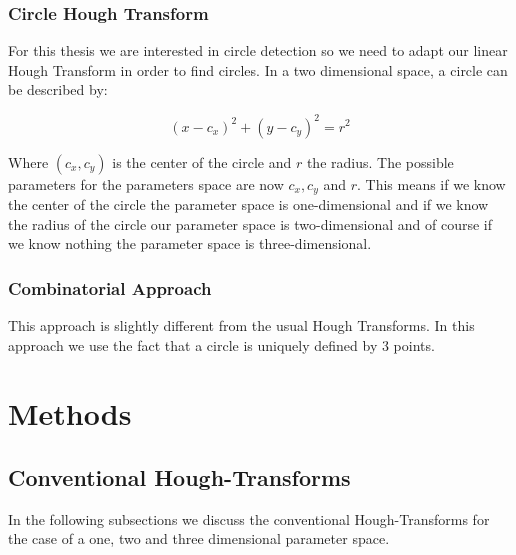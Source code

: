 \documentclass[10pt,twoside]{scrreprt}
\begin{document}


\subsection{Circle Hough Transform} %
\label{sub:circle_hough_transform}

For this thesis we are interested in circle detection so we need to adapt our linear Hough Transform in order to find circles. In a two dimensional space, a circle can be described by:

\begin{equation}
		(x-c_x)^2 + (y-c_y)^2 = r^2
\end{equation}

Where $(c_x,c_y)$ is the center of the circle and $r$ the radius. The possible parameters for the parameters space are now $c_x, c_y$ and $r$. This means if we know the center of the circle the parameter space is one-dimensional and if we know the radius of the circle our parameter space is two-dimensional and of course if we know nothing the parameter space is three-dimensional.


\subsection{Combinatorial Approach} %
\label{sub:combinatorial_approach}

This approach is slightly different from the usual Hough Transforms. In this approach we use the fact that a circle is uniquely defined by 3 points.



\chapter{Methods}

\section{Conventional Hough-Transforms} %
\label{sec:conventional_hough_transforms}

In the following subsections we discuss the conventional Hough-Transforms for the case of a one, two and three dimensional parameter space.
\end{document}
